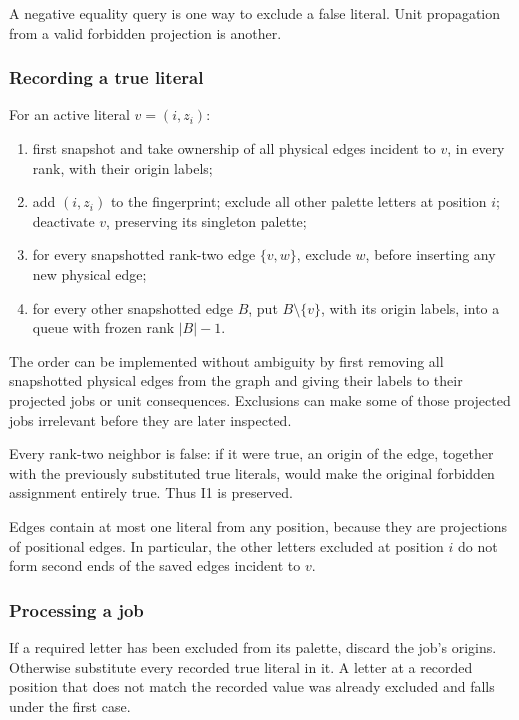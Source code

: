 A negative equality query is one way to exclude a false literal. Unit propagation from a valid forbidden projection is another.

\subsubsection{Recording a true literal}\label{recording-a-true-literal}

For an active literal \(v=(i,z_i)\):

\begin{enumerate}
\def\labelenumi{\arabic{enumi}.}
\tightlist
\item
  first snapshot and take ownership of all physical edges incident to \(v\), in every rank, with their origin labels;
\item
  add \((i,z_i)\) to the fingerprint; exclude all other palette letters at position \(i\); deactivate \(v\), preserving its singleton palette;
\item
  for every snapshotted rank-two edge \(\{v,w\}\), exclude \(w\), before inserting any new physical edge;
\item
  for every other snapshotted edge \(B\), put \(B\setminus\{v\}\), with its origin labels, into a queue with frozen rank \(|B|-1\).
\end{enumerate}

The order can be implemented without ambiguity by first removing all snapshotted physical edges from the graph and giving their labels to their projected jobs or unit consequences. Exclusions can make some of those projected jobs irrelevant before they are later inspected.

Every rank-two neighbor is false: if it were true, an origin of the edge, together with the previously substituted true literals, would make the original forbidden assignment entirely true. Thus I1 is preserved.

Edges contain at most one literal from any position, because they are projections of positional edges. In particular, the other letters excluded at position \(i\) do not form second ends of the saved edges incident to \(v\).

\subsubsection{Processing a job}\label{processing-a-job}

If a required letter has been excluded from its palette, discard the job's origins. Otherwise substitute every recorded true literal in it. A letter at a recorded position that does not match the recorded value was already excluded and falls under the first case.

